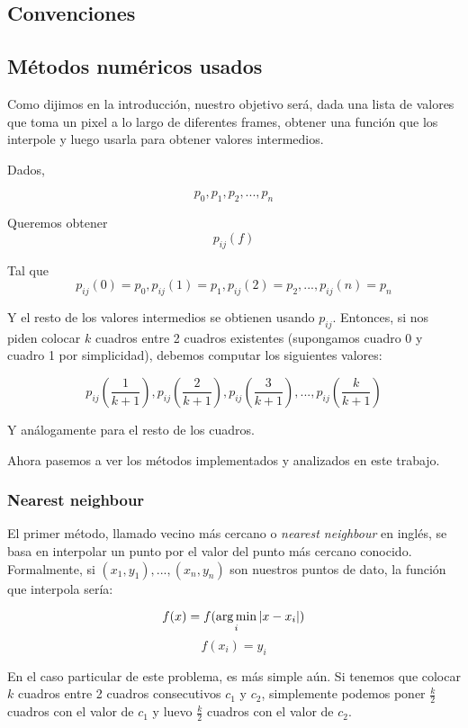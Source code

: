 \subsection{Convenciones}



\subsection{Métodos numéricos usados}

Como dijimos en la introducción, nuestro objetivo será, dada una lista de valores que toma un pixel a lo largo de diferentes frames, obtener una función que los interpole y luego usarla para obtener valores intermedios.

Dados,

\[ p_0, p_1, p_2, ..., p_n \]

Queremos obtener \[p_{ij}(f) \]

Tal que \[p_{ij}(0) = p_0, p_{ij}(1) = p_1, p_{ij}(2) = p_2, ..., p_{ij}(n) = p_n\]

Y el resto de los valores intermedios se obtienen usando $p_{ij}$. Entonces, si nos piden colocar $k$ cuadros entre 2 cuadros existentes (supongamos cuadro 0 y cuadro 1 por simplicidad), debemos computar los siguientes valores:

\[p_{ij}\left(\frac1{k+1}\right), p_{ij}\left(\frac2{k+1}\right), p_{ij}\left(\frac3{k+1}\right), ..., p_{ij}\left(\frac{k}{k+1}\right)\]

Y análogamente para el resto de los cuadros.

Ahora pasemos a ver los métodos implementados y analizados en este trabajo.


\subsubsection{Nearest neighbour}

El primer método, llamado vecino más cercano o \emph{nearest neighbour} en inglés, se basa en interpolar un punto por el valor del punto más cercano conocido. Formalmente, si $(x_1, y_1), ..., (x_n, y_n)$ son nuestros puntos de dato, la función que interpola sería:

\[ f(x) = f(\operatorname*{arg\,min}_{i} |x - x_i|) \]
\[ f(x_i) = y_i \]

En el caso particular de este problema, es más simple aún. Si tenemos que colocar $k$ cuadros entre 2 cuadros consecutivos $c_1$ y $c_2$, simplemente podemos poner $\frac{k}{2}$ cuadros con el valor de $c_1$ y luevo $\frac{k}{2}$ cuadros con el valor de $c_2$.


